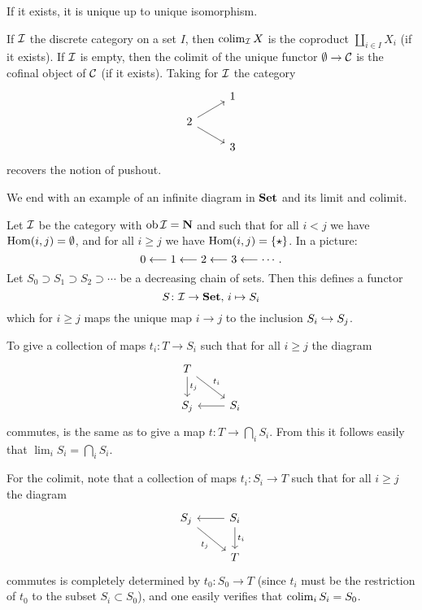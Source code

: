 If it exists, it is unique up to unique isomorphism.

\begin{examples}
If ${\mathcal{I}}$ the discrete category on a set $I$, then $\operatorname{colim}_{\mathcal{I}} X$ is the coproduct $\coprod_{i\in I} X_i$ (if it exists). If ${\mathcal{I}}$ is empty, then the colimit of the unique functor $\emptyset\to {\mathcal{C}}$ is the cofinal object of ${\mathcal{C}}$ (if it exists). Taking for ${\mathcal{I}}$ the category
\[
\begin{tikzcd}[row sep=small]
	& 1  \\  2 \arrow{ru} \arrow{rd}  & \\ & 3  
\end{tikzcd}
\]
recovers the notion of pushout. 
\end{examples}

We end with an example of an infinite diagram in $\mathbf{Set}$ and its limit and colimit.

\begin{example}\label{exa:descending-chain-of-inclusions}
Let ${\mathcal{I}}$ be the category with $\operatorname{ob} {\mathcal{I}} = {\mathbf{N}}$ and such that for all $i<j$ we have $\operatorname{Hom}(i,j) = \emptyset$, and for all $i\geq j$ we have $\operatorname{Hom}(i,j)=\{\star\}$. In a picture:
\[
	0 \longleftarrow 1 \longleftarrow 2 \longleftarrow 3 \longleftarrow \cdots.
\]
Let $S_0 \supset S_1 \supset S_2 \supset \cdots $ be a decreasing chain of sets. Then this defines a functor
\[
	S \colon {\mathcal{I}} \to \mathbf{Set},\, i \mapsto S_i
\]
which for $i\geq j$ maps the unique map $i\to j$ to the inclusion $S_i \hookrightarrow S_j$.

To give a collection of maps $t_i\colon T\to S_i$ such that for all $i\geq j$ the diagram
\[
\begin{tikzcd}
	T \arrow{d}{t_j} \arrow{dr}{t_i} \\
	S_j  & S_i \arrow{l}
\end{tikzcd}
\]
commutes, is the same as to give a map $t\colon T \to \bigcap_i S_i$. From this it follows easily that $\lim_i S_i = \bigcap_i S_i$.

For the colimit, note that a collection of maps $t_i\colon S_i \to T$ such that for all $i\geq j$ the diagram
\[
\begin{tikzcd}
	S_j  \arrow[swap]{dr}{t_j}  & S_i \arrow{d}{t_i} \arrow{l} \\
	& T
\end{tikzcd}
\]
commutes is completely determined by $t_0\colon S_0\to T$ (since $t_i$ must be the restriction of $t_0$ to the subset $S_i\subset S_0$), and one easily verifies that $\operatorname{colim}_i S_i = S_0$.
\end{example}

